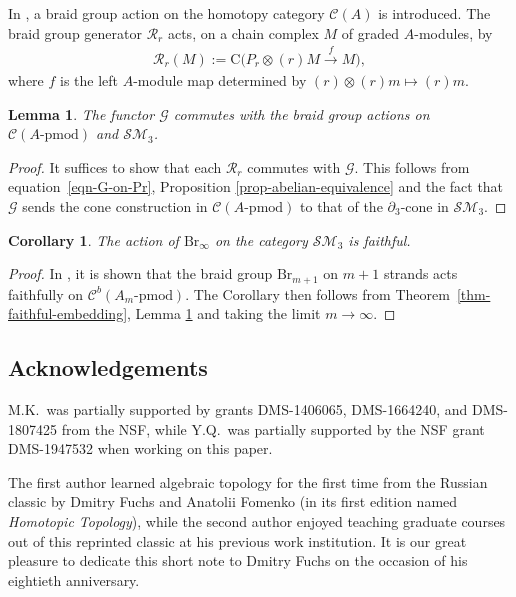 \documentclass[pdftex]{sigma}
\newtheorem{cor}[thm]{Corollary}
\newtheorem{lem}[thm]{Lemma}
\theoremstyle{definition}
\numberwithin{equation}{section}
\renewcommand{\to}{\rightarrow}
\def\dif{\partial}
\def\lra{{\longrightarrow}}
\def\pmod{{\mathrm{\mbox{-}pmod}}} %
\def\mc{\mathcal}
\begin{document}
In \cite{KhSe}, a braid group action on the homotopy category $\mc{C}(A)$ is introduced. The braid group generator $\mc{R}_r$ acts, on a chain complex $M$ of graded $A$-modules, by
\begin{gather*}
 \mc{R}_r(M):= \mathrm{C}\Big(P_r\otimes (r)M \stackrel{f}{\lra} M \Big),
\end{gather*}
where $f$ is the left $A$-module map determined by $(r)\otimes (r)m \mapsto (r)m$.

\begin{lem}\label{lem-G-intertwines-braid-group-action}
The functor $\mc{G}$ commutes with the braid group actions on $\mc{C}(A\pmod)$ and $\mc{SM}_3$.
\end{lem}
\begin{proof}It suffices to show that each $\mc{R}_r$ commutes with $\mc{G}$. This follows from equation~\eqref{eqn-G-on-Pr}, Proposition \ref{prop-abelian-equivalence} and the fact that $\mc{G}$ sends the cone construction in $\mc{C}(A\pmod)$ to that of the $\dif_3$-cone in $\mc{SM}_3$.
\end{proof}

\begin{cor}The action of $\mathrm{Br}_\infty$ on the category $\mc{SM}_3$ is faithful.
\end{cor}
\begin{proof}In \cite[Corollary 1.2]{KhSe}, it is shown that the braid group $\mathrm{Br}_{m+1}$ on $m+1$ strands acts faithfully on $ \mc{C}^b(A_m\pmod) $. The Corollary then follows from Theorem~\ref{thm-faithful-embedding}, Lemma \ref{lem-G-intertwines-braid-group-action} and taking the limit $m\to \infty$.
\end{proof}

\subsection*{Acknowledgements}
M.K.\ was partially supported by grants DMS-1406065, DMS-1664240, and DMS-1807425 from the NSF, while Y.Q.\ was partially supported by the NSF grant DMS-1947532 when working on this paper.

The first author learned algebraic topology for the first time from the Russian classic by Dmitry Fuchs and Anatolii Fomenko \cite{FF} (in its first edition named \emph{Homotopic Topology}), while the second author enjoyed teaching graduate courses out of this reprinted classic at his previous work institution. It is our great pleasure to dedicate this short note to Dmitry Fuchs on the occasion of his eightieth anniversary.
\end{document}

